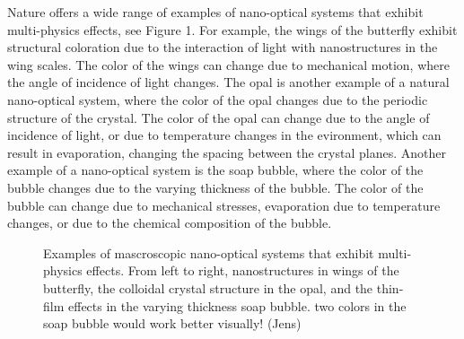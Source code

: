 Nature offers a wide range of examples of nano-optical systems that exhibit 
multi-physics effects, see Figure 1.
For example, the wings of the butterfly exhibit structural coloration due to the
 interaction of light 
with nanostructures in the wing scales. The color of the wings can change due to
 mechanical motion, where the angle of incidence of light changes.
The opal is another example of a natural nano-optical system, where the color of the opal
changes due to the periodic structure of the crystal. The color of the opal can change
due to the angle of incidence of light, or due to temperature changes in the evironment, 
which can result in evaporation, changing the spacing between the crystal planes.
Another example of a nano-optical system is the soap bubble, where the color of the bubble
changes due to the varying thickness of the bubble. The color of the bubble can change due to
mechanical stresses, evaporation due to temperature changes, or due to the chemical composition
of the bubble.

\begin{figure}[tb]
    \centering
    \caption{Examples of mascroscopic nano-optical systems that exhibit multi-physics effects. From left to right, nanostructures in wings of the butterfly, the colloidal crystal structure in the opal, and the thin-film effects in the varying thickness soap bubble.
    two colors in the soap bubble would work better visually! (Jens)}
    \label{fig:motivation_natural}
\end{figure}

